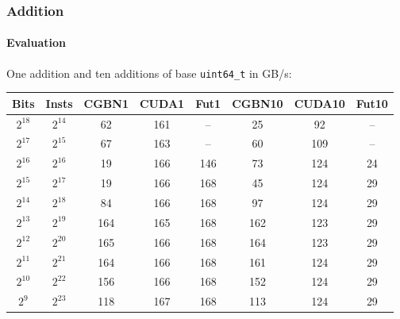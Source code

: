 \begin{frame}[fragile]
  \frametitle{Addition}
  \framesubtitle{Evaluation}
  One addition and ten additions of base \texttt{uint64\_t} in GB/s:\newline
  \begin{center}\scriptsize
  \begin{tabular}{|c|c||c|c|c||c|c|c|}\hline
    Bits & I{\tiny nsts} & CGBN1 & CUDA1 & Fut1 & CGBN10 & CUDA10 & Fut10 \\\hline\hline
    $2^{18}$ & $2^{14}$ & 62  & 161 & --   & 25  & 92  & --  \\\hline
    $2^{17}$ & $2^{15}$ & 67  & 163 & --   & 60  & 109 & --  \\\hline
    $2^{16}$ & $2^{16}$ & 19  & 166 & 146 & 73  & 124 & 24 \\\hline
    $2^{15}$ & $2^{17}$ & 19  & 166 & 168 & 45  & 124 & 29 \\\hline
    $2^{14}$ & $2^{18}$ & 84  & 166 & 168 & 97  & 124 & 29 \\\hline
    $2^{13}$ & $2^{19}$ & 164 & 165 & 168 & 162 & 123 & 29 \\\hline
    $2^{12}$ & $2^{20}$ & 165 & 166 & 168 & 164 & 123 & 29 \\\hline
    $2^{11}$ & $2^{21}$ & 164 & 166 & 168 & 161 & 124 & 29 \\\hline
    $2^{10}$ & $2^{22}$ & 156 & 166 & 168 & 152 & 124 & 29 \\\hline
    $2^{9}$  & $2^{23}$ & 118 & 167 & 168 & 113 & 124 & 29 \\\hline
  \end{tabular}
  \end{center}
\end{frame}

